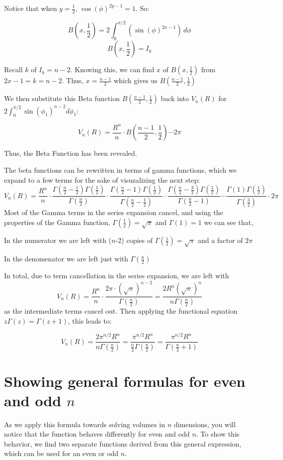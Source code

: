 \documentclass{article}
\begin{document}
Notice that when $y = \frac{1}{2}$, $\cos(\phi)^{2y-1} = 1$. So:

\[B(x,\frac{1}{2}) = 2 \int_0^{\pi/2} (\sin(\phi)^{2x-1}) \, d\phi\]
\[B(x,\frac{1}{2}) = I_k\]

Recall $k$ of $I_k = n-2$. Knowing this, we can find $x$ of $B(x,\frac{1}{2})$ from $2x-1 = k = n-2$. Thus, $x = \frac{n-1}{2}$ which gives us $B(\frac{n-1}{2}, \frac{1}{2})$

We then substitute this Beta function $B(\frac{n-1}{2}, \frac{1}{2})$ back into $V_n(R)$ for $2\int_0^{\pi/2}\sin(\phi_1)^{n-2} d\phi_1$:

\[V_n(R) = \frac{R^n}{n} \cdot B(\frac{n-1}{2}, \frac{1}{2}) \cdots 2\pi\]

Thus, the Beta Function has been revealed. 



The beta functions can be rewritten in terms of gamma functions, which we expand to a few terms for the sake of visuzalizing the next step:
\[
V_n(R)=\frac{R^n}{n} \cdot \frac{\Gamma(\frac{n}{2}-\frac{1}{2})\Gamma(\frac{1}{2})}{\Gamma(\frac{n}{2})} \cdot \frac{\Gamma(\frac{n}{2}-1)\Gamma(\frac{1}{2})}{\Gamma(\frac{n}{2}-\frac{1}{2})} \cdot \frac{\Gamma(\frac{n}{2}-\frac{3}{2})\Gamma(\frac{1}{2})}{\Gamma(\frac{n}{2}-1)} \cdots \frac{\Gamma(1)\Gamma(\frac{1}{2})}{\Gamma(\frac{3}{2})} \cdot 2\pi
\]
Most of the Gamma terms in the series expansion cancel, and using the properties of the Gamma function, $\Gamma(\tfrac{1}{2}) = \sqrt{\pi}$ and $\Gamma(1) = 1$ we can see that,

In the numerator we are left with ($n$-2) copies of $\Gamma(\frac{1}{2}) = \sqrt{\pi}$ and a factor of $2\pi$

In the denomenator we are left just with $\Gamma(\frac{n}{2})$

In total, due to term cancellation in the series expansion, we are left with \[V_n(R)=
\frac{R^n}{n} \cdot \frac{2\pi\cdot(\sqrt{\pi})^{n-2}}{\Gamma(\frac{n}{2})} = \frac{2R^n(\sqrt{\pi})^{n}}{n\Gamma(\frac{n}{2})}
\] as the intermediate terms cancel out.  Then applying the functional equation $z\Gamma(z) = \Gamma(z + 1)$, this leads to:

\[
V_n(R)=\frac{2\pi^{n/2}R^n}{n\Gamma(\frac{n}{2})}=\frac{\pi^{n/2}R^n}{\frac{n}{2}\Gamma(\frac{n}{2})}=\frac{\pi^{n/2}R^n}{\Gamma(\frac{n}{2}+1)}
\]

\section*{Showing general formulas for even and odd $n$}
As we apply this formula towards solving volumes in $n$ dimensions, you will notice that the function behaves differently for even and odd $n$. To show this behavior, we find two separate functions derived from this general expression, which can be used for an even or odd $n$.
\end{document}
